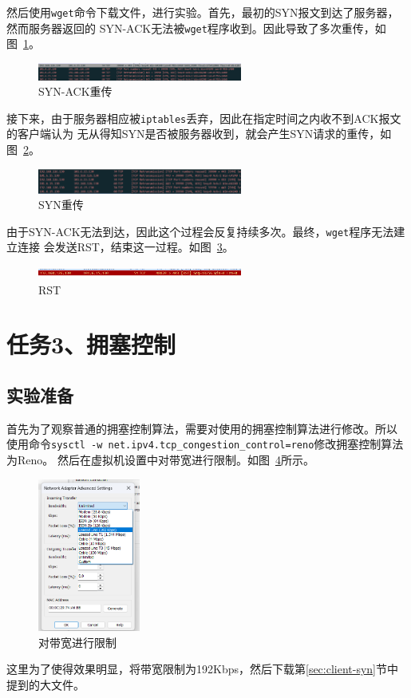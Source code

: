 \documentclass[a4paper,twoside]{article}
\begin{document}
\begin{spacing}{1.2}
然后使用\texttt{wget}命令下载文件，进行实验。首先，最初的SYN报文到达了服务器，然而服务器返回的
SYN-ACK无法被\texttt{wget}程序收到。因此导致了多次重传，如图~\ref{fig:syn}。
\begin{figure}[htb]
	\centering
	\caption{SYN-ACK重传}
	\label{fig:syn}
	\includegraphics[width=0.6\textwidth]{syn.png}
\end{figure}
接下来，由于服务器相应被\texttt{iptables}丢弃，因此在指定时间之内收不到ACK报文的客户端认为
无从得知SYN是否被服务器收到，就会产生SYN请求的重传，如图~\ref{fig:synack}。
\begin{figure}[htb]
	\centering
	\caption{SYN重传}
	\label{fig:synack}
	\includegraphics[width=0.6\textwidth]{synack.png}
\end{figure}

由于SYN-ACK无法到达，因此这个过程会反复持续多次。最终，\texttt{wget}程序无法建立连接
会发送RST，结束这一过程。如图~\ref{fig:rst}。
\begin{figure}[H]
	\centering
	\caption{RST}
	\label{fig:rst}
	\includegraphics[width=0.6\textwidth]{rst.png}
\end{figure}


\section{任务3、拥塞控制}

\subsection{实验准备}

首先为了观察普通的拥塞控制算法，需要对使用的拥塞控制算法进行修改。所以
使用命令\texttt{sysctl -w net.ipv4.tcp\_congestion\_control=reno}修改拥塞控制算法为Reno。
然后在虚拟机设置中对带宽进行限制。如图~\ref{fig:bandwidth}所示。
\begin{figure}[H]
	\centering
	\caption{对带宽进行限制}
	\label{fig:bandwidth}
	\includegraphics[width=0.3\textwidth]{bandwidth.png}
\end{figure}
这里为了使得效果明显，将带宽限制为192Kbps，然后下载第\ref{sec:client-syn}节中
提到的大文件。


\end{spacing}
\end{document}
